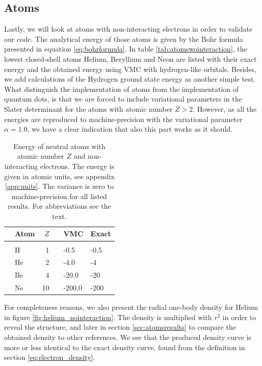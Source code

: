 \subsection{Atoms}
Lastly, we will look at atoms with non-interacting electrons in order to validate our code. The analytical energy of those atoms is given by the Bohr formula presented in equation \eqref{eq:bohrformula}. In table \eqref{tab:atomswointeraction}, the lowest closed-shell atoms Helium, Beryllium and Neon are listed with their exact energy and the obtained energy using VMC with hydrogen-like orbitals. Besides, we add calculations of the Hydrogen ground state energy as another simple test. What distinguish the implementation of atoms from the implementation of quantum dots, is that we are forced to include variational parameters in the Slater determinant for the atoms with atomic number $Z>2$. However, as all the energies are reproduced to machine-precision with the variational parameter $\alpha=1.0$, we have a clear indication that also this part works as it should.

\begin{table}[H]
	\caption{Energy of neutral atoms with atomic number $Z$ and non-interacting electrons. The energy is given in atomic units, see appendix \ref{app:units}. The variance is zero to machine-precision for all listed results. For abbreviations see the text.}
	\label{tab:atomswointeraction}
	\begin{tabularx}{\textwidth}{R{3.5cm}lrrR{2.5cm}R{2.5cm}} \hline\hline
		& Atom & $Z$ & \makecell{\\ \phantom{=}} & VMC & Exact \\ \hline \\
		
		& H & 1 && -0.5 & -0.5 \\
		& He & 2 && -4.0 & -4 \\
		& Be & 4 && -20.0 & -20 \\
		& Ne & 10 && -200.0 & -200 \\ \hline\hline
	\end{tabularx}
\end{table}

For completeness reasons, we also present the radial one-body density for Helium in figure \eqref{fig:helium_nointeraction}. The density is multiplied with $r^2$ in order to reveal the structure, and later in section \ref{sec:atomsresults} to compare the obtained density to other references. We see that the produced density curve is more or less identical to the exact density curve, found from the definition in section \ref{eq:electron_density}.

